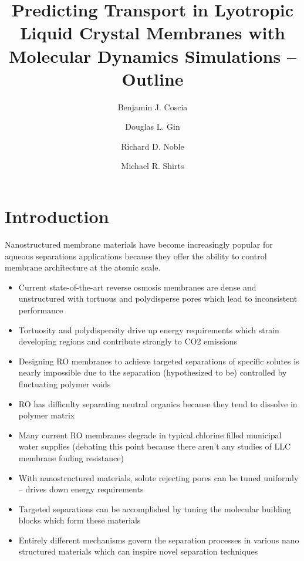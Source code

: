 \documentclass{article}
\title{Predicting Transport in Lyotropic Liquid Crystal Membranes with Molecular Dynamics Simulations -- Outline}
\author{Benjamin J. Coscia \and Douglas L. Gin \and Richard D. Noble \and Michael R. Shirts}
\begin{document}
	
	\maketitle
	\section{Introduction}
	Nanostructured membrane materials have become increasingly popular for aqueous separations applications because they offer the ability to control membrane architecture at the atomic scale.
	\begin{itemize}
		\item Current state-of-the-art reverse osmosis membranes are dense and unstructured with tortuous and polydisperse pores which lead to inconsistent performance
		\item Tortuosity and polydispersity drive up energy requirements which strain developing regions and contribute strongly to CO2 emissions
		\item Designing RO membranes to achieve targeted separations of specific solutes is nearly impossible due to the separation (hypothesized to be) controlled by fluctuating polymer voids
		\item RO has difficulty separating neutral organics because they tend to dissolve in polymer matrix
		\item Many current RO membranes degrade in typical chlorine filled municipal water supplies (debating this point because there aren't any studies of LLC membrane fouling resistance)  
		\item With nanostructured materials, solute rejecting pores can be tuned uniformly -- drives down energy requirements
		\item Targeted separations can be accomplished by tuning the molecular building blocks which form these materials
		\item Entirely different mechanisms govern the separation processes in various nano structured materials which can inspire novel separation techniques
	\end{itemize}
	
\end{document}
